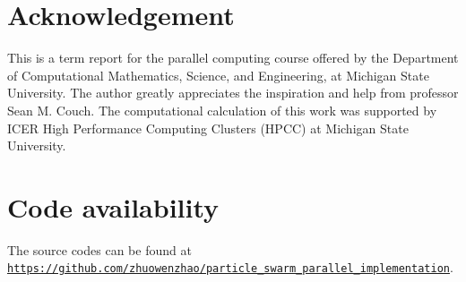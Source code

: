\documentclass[conference, 10pt]{IEEEtran}
\begin{document}
\section*{Acknowledgement}
This is a term report for the parallel computing course offered by the Department of Computational Mathematics, Science, and Engineering, at Michigan State University. 
The author greatly appreciates the inspiration and help from professor Sean M. Couch.
The computational calculation of this work was supported by ICER High Performance Computing Clusters (HPCC) at Michigan State University.

\section*{Code availability}
The source codes can be found at \href{https://github.com/zhuowenzhao/particle_swarm_parallel_implementation}{\nolinkurl{https://github.com/zhuowenzhao/particle_swarm_parallel_implementation}}.



\end{document}
